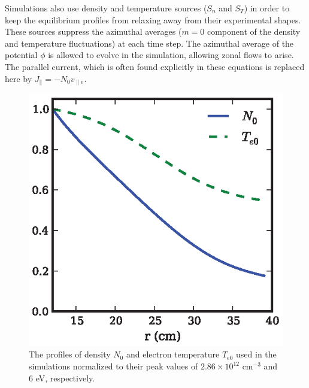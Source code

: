 \documentclass[showpacs,preprintnumbers,amsmath,amssymb,superscriptaddress,aip]{revtex4-1}
\def\para{\parallel}
\newcommand{\vpe}{v_{\parallel e}}
\begin{document}
Simulations also use density and temperature sources ($S_n$ and $S_T$) in order to keep the equilibrium profiles from relaxing away from their experimental shapes. 
These sources suppress the azimuthal averages ($m=0$ component of the density and temperature fluctuations) at each time step. 
The azimuthal average of the potential $\phi$ is allowed to evolve in
the simulation, allowing zonal flows to arise.
The parallel current, which is often found explicitly in these equations is replaced here by $J_\para = - N_0 \vpe$. \\

\begin{figure}[!htbp]
\includegraphics[]{equilibrium_profiles}
\hfil
\caption{The profiles of density $N_0$ and electron temperature $T_{e0}$ used in the simulations normalized to their peak values of $2.86 \times 10^{12}$ cm$^{-3}$ and 
$6$ eV, respectively.}
\label{eq_profiles}
\end{figure}
\end{document}
